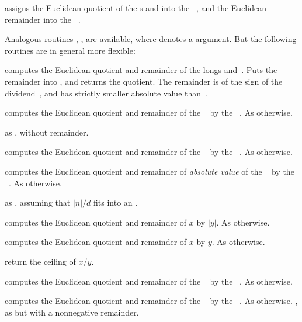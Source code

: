  assigns the Euclidean
quotient of the s  and  into the ~,
and the Euclidean remainder into the ~.

\noindent Analogous routines \kbd{[z]}, \kbd{[z]},
\kbd{[z]} are available, where  denotes a 
argument. But the following routines are in general more flexible:

 computes the Euclidean
quotient and remainder of the longs  and~. Puts the remainder
into , and returns the quotient. The remainder is of the sign of the
dividend~, and has strictly smaller absolute value than~.

 computes the Euclidean
quotient and remainder of the ~ by the ~. As
 otherwise.

 as , without
remainder.

 computes the Euclidean quotient
and remainder of the ~ by the ~. As
 otherwise.

 computes the Euclidean quotient
and remainder of \emph{absolute value} of the ~ by the
~. As  otherwise.

 as , assuming
that $|n|/d$ fits into an .

computes the Euclidean quotient and remainder of $x$ by $|y|$. As
 otherwise.

computes the Euclidean quotient and remainder of $x$ by $y$. As
 otherwise.

 return the ceiling of $x / y$.

 computes the Euclidean quotient
and remainder of the ~ by the ~. As
 otherwise.

 computes the Euclidean quotient
and remainder of the ~ by the ~. As
 otherwise.
\smallskip
{}, as  but with a
nonnegative remainder.

